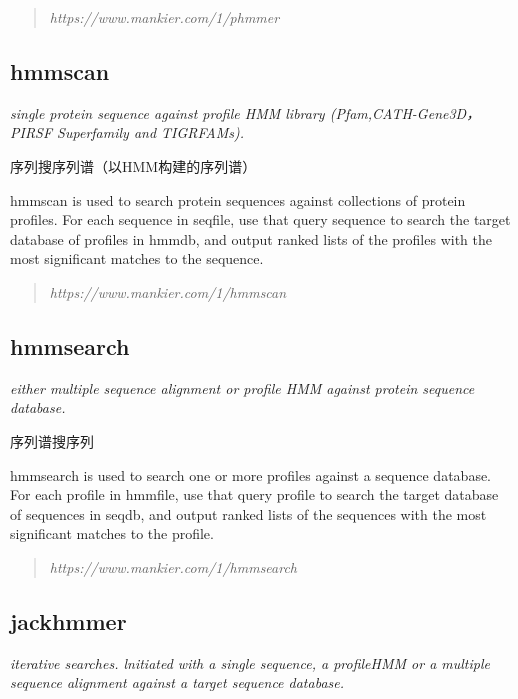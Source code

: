 \begin{quotation}

    \textit{https://www.mankier.com/1/phmmer}

\end{quotation}

\subsection{hmmscan}
\textit{single protein sequence against profile HMM library (Pfam,CATH-Gene3D，PIRSF Superfamily and TIGRFAMs).}

序列搜序列谱（以HMM构建的序列谱）

hmmscan is used to search protein sequences against collections  of protein profiles. For each sequence in seqfile, use that query sequence to search the target database of profiles in hmmdb, and output ranked lists of the profiles with the most significant matches to the sequence.

\begin{quotation}

    \textit{https://www.mankier.com/1/hmmscan}

\end{quotation}


\subsection{hmmsearch}
\textit{either multiple sequence alignment or profile HMM against protein sequence database.}

序列谱搜序列

hmmsearch is used to search one or more profiles against a sequence database. For each profile in hmmfile, use that query profile to search the target database of sequences in seqdb, and output ranked lists of the sequences with the most significant matches to the profile.

\begin{quotation}

    \textit{https://www.mankier.com/1/hmmsearch}

\end{quotation}

\subsection{jackhmmer}
\textit{iterative searches. lnitiated with a single sequence, a profileHMM or a multiple sequence alignment against a target sequence database.}

